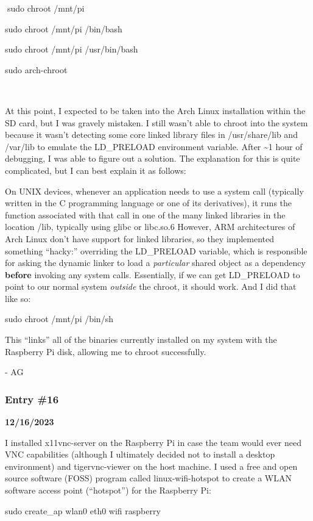sudo chroot /mnt/pi

sudo chroot /mnt/pi /bin/bash

sudo chroot /mnt/pi /usr/bin/bash

sudo arch-chroot



At this point, I expected to be taken into the Arch Linux installation
within the SD card, but I was gravely mistaken. I still wasn't able to
chroot into the system because it wasn't detecting some core linked
library files in /usr/share/lib and /var/lib to emulate the LD\_PRELOAD
environment variable. After \textasciitilde1 hour of debugging, I was
able to figure out a solution. The explanation for this is quite
complicated, but I can best explain it as follows:

On UNIX devices, whenever an application needs to use a system call
(typically written in the C programming language or one of its
derivatives), it runs the function associated with that call in one of
the many linked libraries in the location /lib, typically using glibc or
libc.so.6 However, ARM architectures of Arch Linux don't have support
for linked libraries, so they implemented something ``hacky:''
overriding the LD\_PRELOAD variable, which is responsible for asking the
dynamic linker to load a \emph{particular} shared object as a dependency
\textbf{before} invoking any system calls. Essentially, if we can get
LD\_PRELOAD to point to our normal system \emph{outside} the chroot, it
should work. And I did that like so:

sudo chroot /mnt/pi /bin/sh

This ``links'' all of the binaries currently installed on my system with
the Raspberry Pi disk, allowing me to chroot successfully.

- AG

\subsubsection{Entry \#16}\label{entry-16}

\textbf{12/16/2023}

I installed x11vnc-server on the Raspberry Pi in case the team would
ever need VNC capabilities (although I ultimately decided not to install
a desktop environment) and tigervnc-viewer on the host machine. I used a
free and open source software (FOSS) program called linux-wifi-hotspot
to create a WLAN software access point (``hotspot'') for the Raspberry
Pi:

sudo create\_ap wlan0 eth0 wifi raspberry

